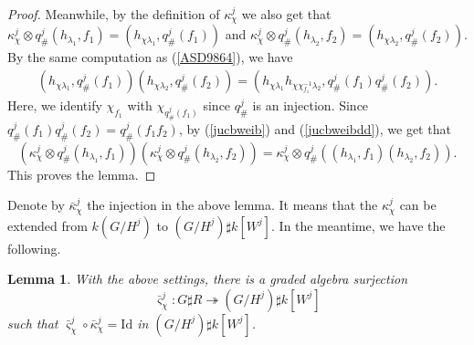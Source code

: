 \documentclass[11pt,reqno]{amsart}
\newtheorem{lemma}[theorem]{Lemma}
\theoremstyle{definition}
\begin{document}
\begin{proof}
Meanwhile, by the definition of $\kappa^{j}_{\chi}$ we also get that 
$\kappa^{j}_{\chi} \otimes q^j_{\#}(h_{\lambda_1},  f_1 ) = 
(h_{ \chi \lambda_1}, q^j_{\#}(f_1))$ and 
$\kappa^{j}_{\chi} \otimes q^j_{\#}(h_{\lambda_2},  f_2 ) = 
(h_{ \chi \lambda_2}, q^j_{\#}(f_2))$. 
By the same computation as
(\ref{ASD9864}), we have 
\begin{align}\label{jucbweibdd}
(h_{ \chi \lambda_1}, q^j_{\#}(f_1)) (h_{ \chi \lambda_2}, q^j_{\#}(f_2)) 
= (h_{ \chi \lambda_1} h_{\chi \chi^{-1}_{f_1}\lambda_2} , q^j_{\#}(f_1) q^j_{\#}(f_2)). 
\end{align}
Here, we identify $\chi_{f_1}$ with $\chi_{q^j_{\#}(f_1)}$ since $q^j_{\#}$ is an injection. 
Since $q^j_{\#}(f_1) q^j_{\#}(f_2) = q^j_{\#}(f_1 f_2)$, 
by 
(\ref{jucbweib}) and (\ref{jucbweibdd}), we get that 
$$
(\kappa^{j}_{\chi} \otimes q^j_{\#}(h_{\lambda_1}, f_1) ) (\kappa^{j}_{\chi} 
\otimes q^j_{\#}(h_{\lambda_2}, f_2)) = 
\kappa^{j}_{\chi} \otimes q^j_{\#}((h_{\lambda_1}, f_1)(h_{\lambda_2}, f_2) ).
$$
This proves the lemma. 
\end{proof}

Denote by $\bar{\kappa}^{j}_{\chi}$  
the injection in the above lemma. 
It means that the 
$\kappa^{j}_{\chi}$ can 
be extended 
from $k(G / H^j)$ to
$(G / H^j) \sharp k[W^{j}]$.
In the meantime, we have the following. 

\begin{lemma}\label{Compos}
With the above settings, there is a graded algebra surjection
$$
	\bar{\varsigma}^{j}_{\chi}: G \sharp R  \twoheadrightarrow   (G / H^j) \sharp k[W^{j}]
$$
such that $\bar\varsigma^{j}_{\chi} \circ \bar\kappa^{j}_{\chi} 
= \mathrm{Id}$ in $(G / H^j) \sharp k[W^{j}]$. 
\end{lemma}
\end{document}
